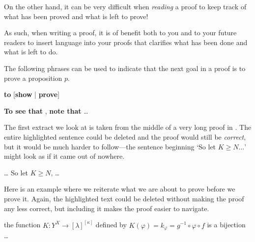 On the other hand, it can be very difficult when \textit{reading} a proof to keep track of what has been proved and what is left to prove!

As such, when writing a proof, it is of benefit both to you and to your future readers to insert language into your proofs that clarifies what has been done and what is left to do.

\begin{vocabulary}
\label{vcbStatingGoal}
The following phrases can be used to indicate that the next goal in a proof is to prove a proposition $p$.

\begin{vocabtemplate}
 \textbf{to} [\textbf{show} | \textbf{prove}] 

\vtor

\textbf{To see that} , \textbf{note that} \dots{}
\end{vocabtemplate}
\end{vocabulary}

The first extract we look at is taken from the middle of a very long proof in . The entire highlighted sentence could be deleted and the proof would still be \textit{correct}, but it would be much harder to follow---the sentence beginning `So let $K \ge N\dots{}$' might look as if it came out of nowhere.

\begin{extract}
\label{xtrStatingGoalsExample}
\dots{}  So let $K \ge N$, \dots{}
\end{extract}

Here is an example where we reiterate what we are about to prove before we prove it. Again, the highlighted text could be deleted without making the proof any less correct, but including it makes the proof easier to navigate.

\begin{extract}
\label{xtrStatingGoalsExampleTwo}
 the function $K : Y^X \to [\lambda]^{[\kappa]}$ defined by $K(\varphi) = k_{\varphi} = g^{-1} \circ \varphi \circ f$ is a bijection \dots{}
\end{extract}

